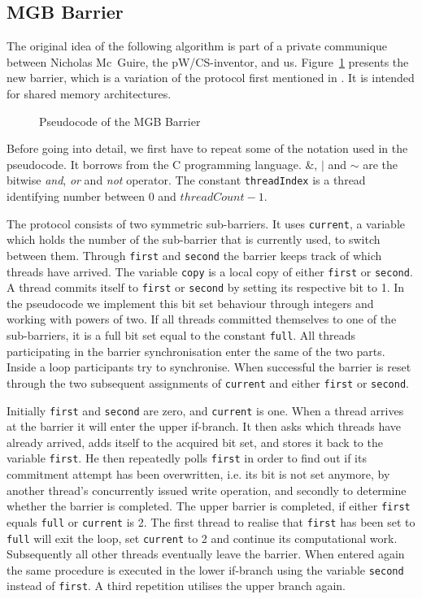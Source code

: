 \documentclass[a4paper, 10pt]{article}
\begin{document}
\subsection{MGB Barrier}
\label{ssec:new-mgb}
The original idea of the following algorithm is part of a private communique between Nicholas Mc~Guire, the pW/CS-inventor, and us. Figure~\ref{fig:pseudocode-mgb} presents the new barrier, which is a variation of the protocol first mentioned in \cite{bre13}. It is intended for shared memory architectures.

\begin{figure}[htbp]
	\centering
	
	\caption{Pseudocode of the MGB Barrier}
	\label{fig:pseudocode-mgb}
\end{figure}

Before going into detail, we first have to repeat some of the notation used in the pseudocode. It borrows from the C programming language. \&, $|$ and $\sim$ are the bitwise \emph{and}, \emph{or} and \emph{not} operator. The constant \texttt{threadIndex} is a thread identifying number between 0 and $\mathit{threadCount}-1$.

The protocol consists of two symmetric sub-barriers. It uses \texttt{current}, a variable which holds the number of the sub-barrier that is currently used, to switch between them.
Through \texttt{first} and \texttt{second} the barrier keeps track of which threads have arrived.
The variable \texttt{copy} is a local copy of either \texttt{first} or \texttt{second}.
A thread commits itself to \texttt{first} or \texttt{second} by setting its respective bit to 1. In the pseudocode we implement this bit set behaviour through integers and working with powers of two. If all threads committed themselves to one of the sub-barriers, it is a full bit set equal to the constant \texttt{full}.
All threads participating in the barrier synchronisation enter the same of the two parts.
Inside a loop participants try to synchronise. When successful the barrier is reset through the two subsequent assignments of \texttt{current} and either \texttt{first} or \texttt{second}.

Initially \texttt{first} and \texttt{second} are zero, and \texttt{current} is one. When a thread arrives at the barrier it will enter the upper if-branch. It then asks which threads have already arrived, adds itself to the acquired bit set, and stores it back to the variable \texttt{first}.
He then repeatedly polls \texttt{first} in order to find out if its commitment attempt has been overwritten, i.e. its bit is not set anymore, by another thread's concurrently issued write operation, and secondly to determine whether the barrier is completed. The upper barrier is completed, if either \texttt{first} equals \texttt{full} or \texttt{current} is 2. The first thread to realise that \texttt{first} has been set to \texttt{full} will exit the loop, set \texttt{current} to 2 and continue its computational work. Subsequently all other threads eventually leave the barrier.
When entered again the same procedure is executed in the lower if-branch using the variable \texttt{second} instead of \texttt{first}. A third repetition utilises the upper branch again.
\end{document}
